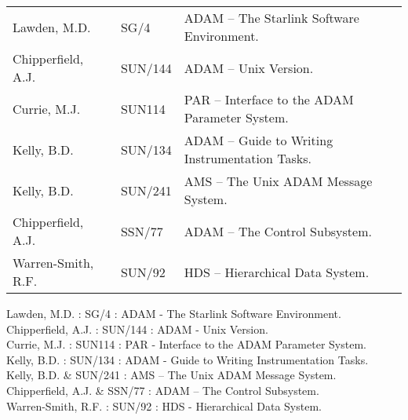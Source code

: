 \documentclass[twoside,11pt]{article}
\newenvironment{latexonly}{}{}
\newcommand{\xref}[3]{#1}
\renewcommand{\_}{\texttt{\symbol{95}}}
\begin{document}
\begin{latexonly}
\begin {tabular}{lll}
Lawden, M.D. & \xref{SG/4}{sg4}{} 
& ADAM -- The Starlink Software Environment.\\
Chipperfield, A.J. & \xref{SUN/144}{sun144}{}
& ADAM -- Unix Version.\\
Currie, M.J. & \xref{SUN114}{sun114}{}
& PAR -- Interface to the ADAM Parameter System.\\
Kelly, B.D. & \xref{SUN/134}{sun134}{}
& ADAM -- Guide to Writing Instrumentation Tasks.\\
Kelly, B.D. & \xref{SUN/241}{sun241}{}
& AMS -- The Unix ADAM Message System.\\
Chipperfield, A.J. & \xref{SSN/77}{ssn77}{}
& ADAM -- The Control Subsystem.\\
Warren-Smith, R.F. & \xref{SUN/92}{sun92}{}
& HDS -- Hierarchical Data System.
\end {tabular}
\end{latexonly}
\begin{htmlonly}
Lawden, M.D. : \xref{SG/4}{sg4}{} :
ADAM - The Starlink Software Environment.\\
Chipperfield, A.J. : \xref{SUN/144}{sun144}{} :
ADAM - Unix Version.\\
Currie, M.J. : \xref{SUN114}{sun114}{} :
PAR - Interface to the ADAM Parameter System.\\
Kelly, B.D. : \xref{SUN/134}{sun134}{} :
ADAM - Guide to Writing Instrumentation Tasks.\\
Kelly, B.D. & \xref{SUN/241}{sun241}{} :
AMS -- The Unix ADAM Message System.\\
Chipperfield, A.J. & \xref{SSN/77}{ssn77}{} :
ADAM -- The Control Subsystem.\\
Warren-Smith, R.F. : \xref{SUN/92}{sun92}{} :
HDS - Hierarchical Data System.
\end{htmlonly}
\end{document}
